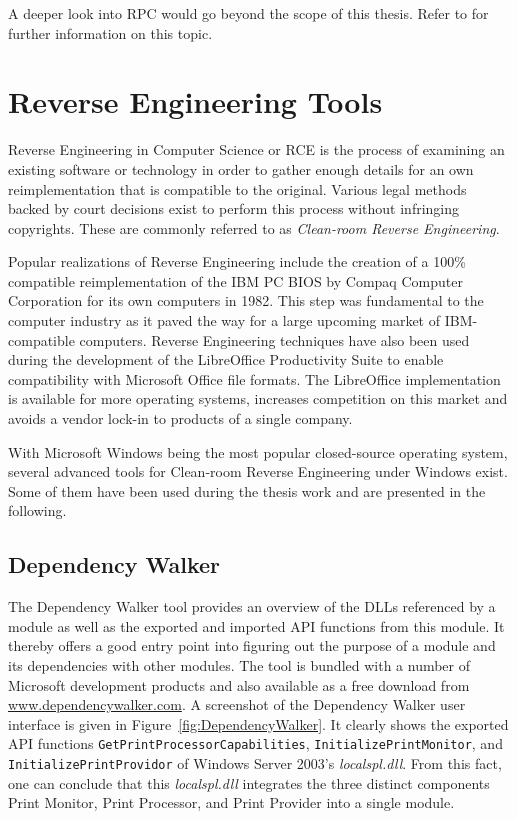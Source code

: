 A deeper look into \gls{RPC} would go beyond the scope of this thesis.
Refer to \cite{shirleyrosenberry1995msrpc} for further information on this topic.


\section{Reverse Engineering Tools}
Reverse Engineering in Computer Science or \gls{RCE} is the process of examining an existing software or technology in order to gather enough details for an own reimplementation that is compatible to the original.
Various legal methods backed by court decisions exist to perform this process without infringing copyrights.
These are commonly referred to as \emph{Clean-room Reverse Engineering}.

Popular realizations of Reverse Engineering include the creation of a 100\% compatible reimplementation of the IBM PC \gls{BIOS} by Compaq Computer Corporation for its own computers in 1982.
This step was fundamental to the computer industry as it paved the way for a large upcoming market of IBM-compatible computers.
Reverse Engineering techniques have also been used during the development of the LibreOffice Productivity Suite to enable compatibility with Microsoft Office file formats. The LibreOffice implementation is available for more operating systems, increases competition on this market and avoids a vendor lock-in to products of a single company.

With Microsoft Windows being the most popular closed-source operating system, several advanced tools for Clean-room Reverse Engineering under Windows exist.
Some of them have been used during the thesis work and are presented in the following.


\subsection{Dependency Walker}
The Dependency Walker tool provides an overview of the \glspl{DLL} referenced by a module as well as the exported and imported \gls{API} functions from this module.
It thereby offers a good entry point into figuring out the purpose of a module and its dependencies with other modules.
The tool is bundled with a number of Microsoft development products and also available as a free download from \href{http://www.dependencywalker.com}{www.dependencywalker.com}. 
A screenshot of the Dependency Walker user interface is given in Figure~\ref{fig:DependencyWalker}.
It clearly shows the exported \gls{API} functions \texttt{GetPrintProcessorCapabilities}, \texttt{InitializePrintMonitor}, and \texttt{InitializePrintProvidor} of Windows Server 2003's \emph{localspl.dll}.
From this fact, one can conclude that this \emph{localspl.dll} integrates the three distinct components Print Monitor, Print Processor, and Print Provider into a single module.

